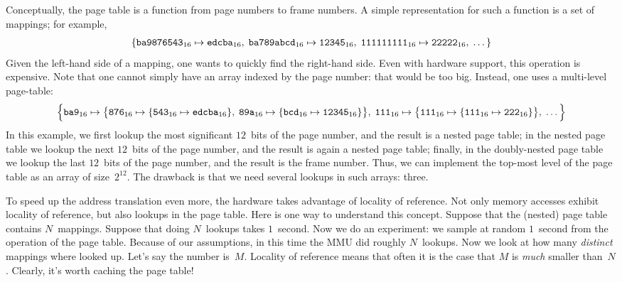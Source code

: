 Conceptually,
  the page table is a function from page numbers to frame numbers.
A simple representation for such a function is a set of mappings; for example,
\begin{align*}
  \{
  {\tt ba9876543}_{16} \mapsto {\tt edcba}_{16},\;
  {\tt ba789abcd}_{16} \mapsto {\tt 12345}_{16},\;
  {\tt 111111111}_{16} \mapsto {\tt 22222}_{16},\;
  \dots
  \}
\end{align*}
Given the left-hand side of a mapping, one wants to quickly find the right-hand side.
Even with hardware support, this operation is expensive.
Note that one cannot simply have an array indexed by the page number:
  that would be too big.
Instead, one uses a multi-level page-table:
\begin{align*}
  \Bigl\{
    {\tt ba9}_{16} \mapsto
      \bigl\{
        {\tt 876}_{16} \mapsto \{ {\tt 543}_{16} \mapsto {\tt edcba}_{16}\},\;
        {\tt 89a}_{16} \mapsto \{ {\tt bcd}_{16} \mapsto {\tt 12345}_{16}\}
      \bigr\},\;
    {\tt 111}_{16} \mapsto
      \bigl\{
        {\tt 111}_{16} \mapsto \{ {\tt 111}_{16} \mapsto {\tt 222}_{16} \}
      \bigr\},\;
    \dots
  \Bigr\}
\end{align*}
In this example, we first lookup the most significant $12$~bits of the page number,
  and the result is a nested page table;
  in the nested page table we lookup the next $12$~bits of the page number,
  and the result is again a nested page table;
  finally, in the doubly-nested page table we lookup the last $12$~bits of the page number,
  and the result is the frame number.
Thus,
  we can implement the top-most level of the page table as an array of size~$2^{12}$.
The drawback is that we need several lookups in such arrays: three.

To speed up the address translation even more,
  the hardware takes advantage of locality of reference.
Not only memory accesses exhibit locality of reference,
  but also lookups in the page table.
Here is one way to understand this concept.
Suppose that the (nested) page table contains $N$~mappings.
Suppose that doing $N$~lookups takes $1$~second.
Now we do an experiment:
  we sample at random $1$~second from the operation of the page table.
Because of our assumptions, in this time the MMU did roughly $N$~lookups.
Now we look at how many \emph{distinct} mappings where looked up.
Let's say the number is~$M$.
Locality of reference means that often it is the case
  that $M$ is \emph{much} smaller than~$N$.
Clearly, it's worth caching the page table!

